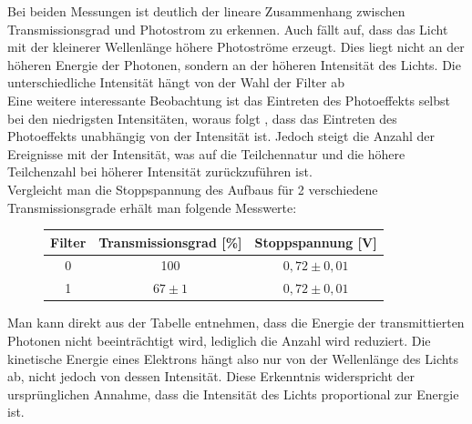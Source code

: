\documentclass{scrartcl}
\begin{document}
		Bei beiden Messungen ist deutlich der lineare Zusammenhang zwischen Transmissionsgrad und Photostrom zu erkennen.
		Auch fällt auf, dass das Licht mit der kleinerer Wellenlänge höhere Photoströme erzeugt. Dies liegt nicht an der höheren Energie
		der Photonen, sondern an der höheren Intensität des Lichts. Die unterschiedliche Intensität hängt von der Wahl der Filter ab \\
		Eine weitere interessante Beobachtung ist das Eintreten des Photoeffekts selbst bei den niedrigsten Intensitäten, woraus folgt
		, dass das Eintreten des Photoeffekts unabhängig von der Intensität ist. Jedoch steigt die Anzahl der Ereignisse mit der Intensität,
		was auf die Teilchennatur und die höhere Teilchenzahl bei höherer Intensität zurückzuführen ist.\\
		Vergleicht man die Stoppspannung des Aufbaus für 2 verschiedene Transmissionsgrade erhält man folgende Messwerte:
		\begin{figure}[H]
			\centering
			\begin{tabular}{|c|c|c|}
				\hline
				Filter & Transmissionsgrad [\%] & Stoppspannung [V] \\
				\hline
				0 & 100 & $0,72\pm 0,01$ \\ 
				1 & $67\pm 1$ & $0,72\pm 0,01$ \\
				\hline
			\end{tabular}
		\end{figure}
		Man kann direkt aus der Tabelle entnehmen, dass die Energie der transmittierten Photonen nicht beeinträchtigt wird, lediglich die 
		Anzahl wird reduziert. Die kinetische Energie eines Elektrons hängt also nur von der Wellenlänge des Lichts ab, nicht jedoch von
		dessen Intensität. Diese Erkenntnis widerspricht der ursprünglichen Annahme, dass die Intensität 
		des Lichts proportional zur Energie ist.
		
\end{document}
